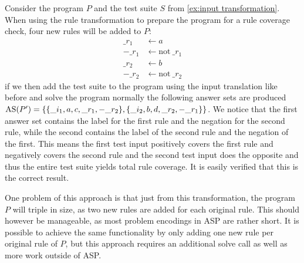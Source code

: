 \begin{example}
\label{ex:rule transformation}
    Consider the program $P$ and the test suite $S$ from \cref{ex:input transformation}. 
    When using the rule transformation to prepare the program for a rule coverage check, four new rules will be added to $P$:
    \begin{align*}
        \_r_1 &\leftarrow a \\
        -\_r_1 &\leftarrow \text{not}\ \_r_1 \\
        \_r_2 &\leftarrow b \\
        -\_r_2 &\leftarrow \text{not}\ \_r_2
    \end{align*}
    if we then add the test suite to the program using the input translation like before and solve the program normally the following answer sets are produced \(\operatorname{AS}(P') = \{\{\_i_1, a, c, \_r_1, -\_r_2\}, \{\_i_2, b, d, \_r_2, -\_r_1\}\}\). We notice that the first answer set contains the label for the first rule and the negation for the second rule, while the second contains the label of the second rule and the negation of the first. This means the first test input positively covers the first rule and negatively covers the second rule and the second test input does the opposite and thus the entire test suite yields total rule coverage. It is easily verified that this is the correct result.
\end{example}

One problem of this approach is that just from this transformation, the program $P$ will triple in size, as two new rules are added for each original rule. This should however be manageable, as most problem encodings in ASP are rather short. It is possible to achieve the same functionality by only adding one new rule per original rule of $P$, but this approach requires an additional solve call as well as more work outside of ASP.

\begin{comment}
- $\_ri$ label for every rule i     \/

- add new rule to program for each label: $\{\_ri\}$ is the head, the body is identical to the body of the rule i       \/

- example           \/

- if the body of rule i is true in some answer set (aka $X |= B(r_i)$) then rule i is positively covered and $\_ri$ will appear in the answer set       \/

-> $\_ri$ in answer set <=> rule i is positively covered        \/

-> $\_ri$ not in answer set <=> rule i is negatively covered (proof for these?) \/
\end{comment}


